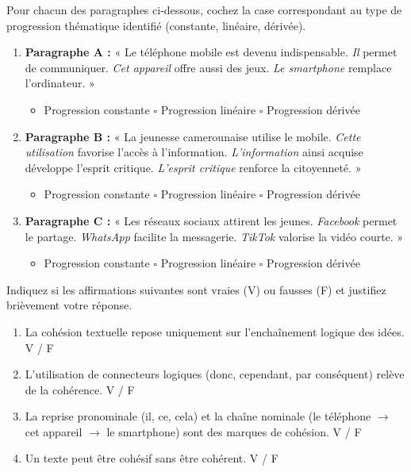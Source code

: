 \documentclass[11pt]{article}
\begin{document}
\begin{exercice}
Pour chacun des paragraphes ci-dessous, cochez la case correspondant au type de progression thématique identifié (constante, linéaire, dérivée).

\begin{enumerate}
\item \textbf{Paragraphe A :} « Le téléphone mobile est devenu indispensable. \emph{Il} permet de communiquer. \emph{Cet appareil} offre aussi des jeux. \emph{Le smartphone} remplace l'ordinateur. »
\begin{itemize}
\item[$\square$] Progression constante \quad $\square$ Progression linéaire \quad $\square$ Progression dérivée
\end{itemize}

\item \textbf{Paragraphe B :} « La jeunesse camerounaise utilise le mobile. \emph{Cette utilisation} favorise l'accès à l'information. \emph{L'information} ainsi acquise développe l'esprit critique. \emph{L'esprit critique} renforce la citoyenneté. »
\begin{itemize}
\item[$\square$] Progression constante \quad $\square$ Progression linéaire \quad $\square$ Progression dérivée
\end{itemize}

\item \textbf{Paragraphe C :} « Les réseaux sociaux attirent les jeunes. \emph{Facebook} permet le partage. \emph{WhatsApp} facilite la messagerie. \emph{TikTok} valorise la vidéo courte. »
\begin{itemize}
\item[$\square$] Progression constante \quad $\square$ Progression linéaire \quad $\square$ Progression dérivée
\end{itemize}
\end{enumerate}
\end{exercice}

\begin{exercice}
Indiquez si les affirmations suivantes sont vraies (V) ou fausses (F) et justifiez brièvement votre réponse.

\begin{enumerate}
\item La cohésion textuelle repose uniquement sur l'enchaînement logique des idées. \hfill V / F
\item L'utilisation de connecteurs logiques (donc, cependant, par conséquent) relève de la cohérence. \hfill V / F
\item La reprise pronominale (il, ce, cela) et la chaîne nominale (le téléphone $\to$ cet appareil $\to$ le smartphone) sont des marques de cohésion. \hfill V / F
\item Un texte peut être cohésif sans être cohérent. \hfill V / F
\end{enumerate}
\end{exercice}
\end{document}
